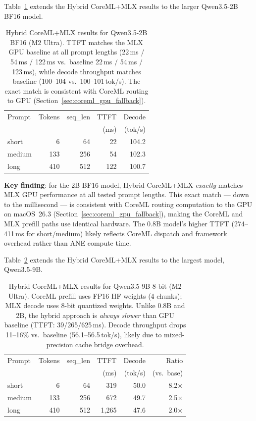 \documentclass[11pt]{article}
\begin{document}
Table~\ref{tab:hybrid_2b} extends the Hybrid CoreML+MLX results to the
larger Qwen3.5-2B BF16 model.

\begin{table}[h]
\centering
\small
\begin{tabular}{@{}lrrrr@{}}
\toprule
Prompt & Tokens & seq\_len & TTFT & Decode \\
 & & & (ms) & (tok/s) \\
\midrule
short & 6 & 64 & 22 & 104.2 \\
medium & 133 & 256 & 54 & 102.3 \\
long & 410 & 512 & 122 & 100.7 \\
\bottomrule
\end{tabular}
\caption{Hybrid CoreML+MLX results for Qwen3.5-2B BF16 (M2 Ultra).
  TTFT matches the MLX GPU baseline at all prompt lengths
  (22\,ms / 54\,ms / 122\,ms vs.\ baseline 22\,ms / 54\,ms / 123\,ms),
  while decode throughput matches baseline (100--104 vs.\ 100--101\,tok/s).
  The exact match is consistent with CoreML routing to GPU
  (Section~\ref{sec:coreml_gpu_fallback}).}
\label{tab:hybrid_2b}
\end{table}

\textbf{Key finding}: for the 2B BF16 model, Hybrid CoreML+MLX
\emph{exactly} matches MLX GPU performance at all tested prompt lengths.
This exact match --- down to the millisecond --- is consistent with
CoreML routing computation to the GPU on macOS~26.3
(Section~\ref{sec:coreml_gpu_fallback}), making the CoreML and MLX
prefill paths use identical hardware.
The 0.8B model's higher TTFT (274--411\,ms for short/medium) likely
reflects CoreML dispatch and framework overhead rather than ANE
compute time.

Table~\ref{tab:hybrid_9b} extends the Hybrid CoreML+MLX results to the
largest model, Qwen3.5-9B.

\begin{table}[h]
\centering
\small
\begin{tabular}{@{}lrrrrr@{}}
\toprule
Prompt & Tokens & seq\_len & TTFT & Decode & Ratio \\
 & & & (ms) & (tok/s) & (vs.\ base) \\
\midrule
short & 6 & 64 & 319 & 50.0 & 8.2$\times$ \\
medium & 133 & 256 & 672 & 49.7 & 2.5$\times$ \\
long & 410 & 512 & 1{,}265 & 47.6 & 2.0$\times$ \\
\bottomrule
\end{tabular}
\caption{Hybrid CoreML+MLX results for Qwen3.5-9B 8-bit (M2 Ultra).
  CoreML prefill uses FP16 HF weights (4 chunks); MLX decode uses 8-bit
  quantized weights.
  Unlike 0.8B and 2B, the hybrid approach is \emph{always slower} than
  GPU baseline (TTFT: 39/265/625\,ms).
  Decode throughput drops 11--16\% vs.\ baseline (56.1--56.5\,tok/s),
  likely due to mixed-precision cache bridge overhead.}
\label{tab:hybrid_9b}
\end{table}
\end{document}
